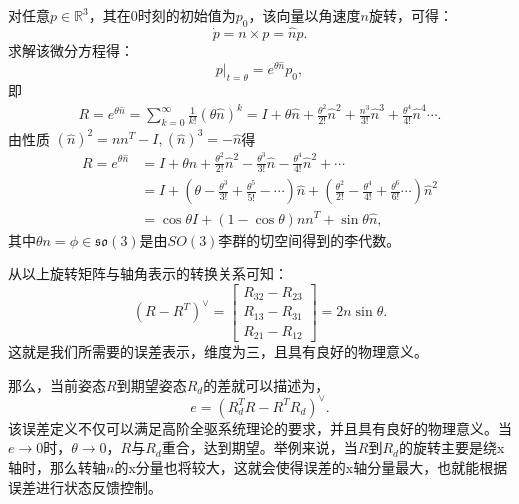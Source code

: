 对任意$p \in \mathbb{R}^{3}$，其在0时刻的初始值为$p_0$，该向量以角速度$n$旋转，可得：
$$\dot p=n \times p=\widehat n p.$$
求解该微分方程得：
$$p|_{t=\theta}=e^{\theta \widehat n} p_0,$$
即$$\begin{aligned}R=e^{\theta \widehat n}=\sum_{k=0}^\infty \frac{1}{k!}(\theta \widehat n)^k
       =I+\theta \widehat n+\frac{\theta^2}{2 !} \widehat{n}^2+\frac{n^3}{3 !} \widehat{n}^3+\frac{\theta^4}{4 !} \widehat{n}^4\cdots .\end{aligned}      $$
由性质 $(\widehat n)^2=nn^T-I,(\widehat n)^3=-\widehat n$得
$$\begin{aligned}R=e^{\theta \widehat n}&=
      I+\theta \widehat{n}+\frac{\theta^2}{2 !} \widehat{n}^2-\frac{\theta^3}{3 !} \widehat{n}-\frac{\theta^4}{4 !} \widehat{n}^2+\cdots \\
      & =I+\left(\theta-\frac{\theta^3}{3 !}+\frac{\theta^5}{5 !}-\cdots\right) \widehat{n}+\left(\frac{\theta^2}{2 !}-\frac{\theta^4}{4 !}+\frac{\theta^6}{6 !} \cdots\right) \widehat{n}^2 \\
      &=\cos \theta I+(1- \cos \theta)nn^T+\sin\theta \widehat n,
      \end{aligned}      $$
其中$\theta n=\phi \in \mathfrak{so}(3)$是由$SO(3)$李群的切空间得到的李代数\cite{Liegroup}。

从以上旋转矩阵与轴角表示的转换关系可知：
\begin{equation}
  (R-R^T)^\vee=\begin{bmatrix}
    R_{32}-R_{23} \\
    R_{13}-R_{31} \\
    R_{21}-R_{12}
    \end{bmatrix}=2 n \sin\theta.
    \label{error}
\end{equation}
这就是我们所需要的误差表示，维度为三，且具有良好的物理意义。

那么，当前姿态$R$到期望姿态$R_d$的差就可以描述为，
\begin{equation}
    e=(R_d^TR-R^TR_d)^\vee.
\end{equation}
该误差定义不仅可以满足高阶全驱系统理论的要求，并且具有良好的物理意义。当$e\to 0$时，$\theta \to 0$，$R$与$R_d$重合，达到期望。举例来说，当$R$到$R_d$的旋转主要是绕x轴时，那么转轴$n$的x分量也将较大，这就会使得误差的x轴分量最大，也就能根据误差进行状态反馈控制。

